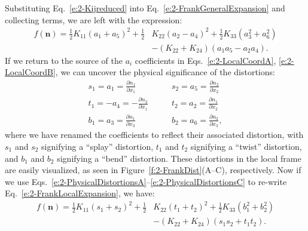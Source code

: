 Substituting Eq.~\ref{e:2-Kijreduced} into Eq.~\ref{e:2-FrankGeneralExpansion} and collecting terms, we are left with the expression:
\begin{align}
  f(\mathbf{n}) = \frac{1}{2}K_{11} (a_1 + a_5)^2 + \frac{1}{2}&K_{22} (a_2 - a_4)^2 + \frac{1}{2}K_{33} (a_3^2 + a_6^2) \nonumber \\
    &- (K_{22} + K_{24}) (a_1 a_5 - a_2 a_4).\label{e:2-FrankLocalExpansion}
\end{align}
If we return to the source of the $a_i$ coefficients in Eqs.~\ref{e:2-LocalCoordA}, \ref{e:2-LocalCoordB}, we can uncover the physical significance of the distortions:
\begin{align}
  s_1 = a_1 = \frac{\partial n_1}{\partial x_1} \quad & \quad s_2 = a_5 = \frac{\partial n_2}{\partial x_2}\label{e:2-PhysicalDistortionsA} \\
  t_1 = - a_4 = -\frac{\partial n_2}{\partial x_1} \quad & \quad t_2 = a_2 = \frac{\partial n_1}{\partial x_2}\label{e:2-PhysicalDistortionsB} \\
  b_1 =  a_3 = \frac{\partial n_1}{\partial x_3} \quad & \quad b_2 = a_6 = \frac{\partial n_2}{\partial x_3},\label{e:2-PhysicalDistortionsC}
\end{align}
where we have renamed the coefficients to reflect their associated distortion, with $s_1$ and $s_2$ signifying a ``splay'' distortion, $t_1$ and $t_2$ signifying a ``twist'' distortion, and $b_1$ and $b_2$ signifying a ``bend'' distortion.
These distortions in the local frame are easily visualized, as seen in Figure~\ref{f:2-FrankDist}(A--C), respectively.
Now if we use Eqs.~\ref{e:2-PhysicalDistortionsA}--\ref{e:2-PhysicalDistortionsC} to re-write Eq.~\ref{e:2-FrankLocalExpansion}, we have:
\begin{align}
  f(\mathbf{n}) = \frac{1}{2}K_{11} (s_1 + s_2)^2 + \frac{1}{2}&K_{22} (t_1 + t_2)^2 + \frac{1}{2}K_{33} (b_1^2 + b_2^2) \nonumber \\
    & - (K_{22} + K_{24}) (s_1 s_2 + t_1 t_2).\label{e:2-FrankPhysicalExpansion}
\end{align}

